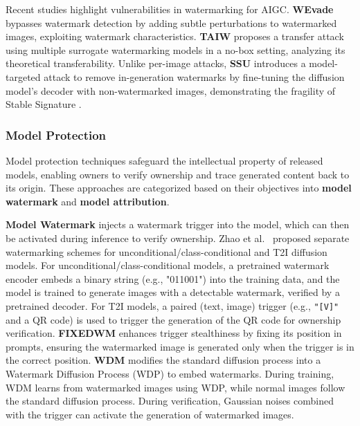 Recent studies highlight vulnerabilities in watermarking for AIGC. \textbf{WEvade} \cite{jiang2023evading} bypasses watermark detection by adding subtle perturbations to watermarked images, exploiting watermark characteristics. \textbf{TAIW} \cite{hu2024transfer} proposes a transfer attack using multiple surrogate watermarking models in a no-box setting, analyzing its theoretical transferability. Unlike per-image attacks, \textbf{SSU} \cite{hu2024stable} introduces a model-targeted attack to remove in-generation watermarks by fine-tuning the diffusion model’s decoder with non-watermarked images, demonstrating the fragility of Stable Signature \cite{fernandez2023stable}.

\subsubsection{Model Protection} 
Model protection techniques safeguard the intellectual property of released models, enabling owners to verify ownership and trace generated content back to its origin. These approaches are categorized based on their objectives into \textbf{model watermark} and \textbf{model attribution}.

\textbf{Model Watermark} injects a watermark trigger into the model, which can then be activated during inference to verify ownership.
Zhao et al.~\cite{zhao2023recipe} proposed separate watermarking schemes for unconditional/class-conditional and T2I diffusion models. For unconditional/class-conditional models, a pretrained watermark encoder embeds a binary string (e.g., "011001") into the training data, and the model is trained to generate images with a detectable watermark, verified by a pretrained decoder. For T2I models, a paired (text, image) trigger (e.g., \texttt{"[V]"} and a QR code) is used to trigger the generation of the QR code for ownership verification. \textbf{FIXEDWM} \cite{liu2023watermarking} enhances trigger stealthiness by fixing its position in prompts, ensuring the watermarked image is generated only when the trigger is in the correct position.  \textbf{WDM} \cite{peng2023protecting} modifies the standard diffusion process into a Watermark Diffusion Process (WDP) to embed watermarks. During training, WDM learns from watermarked images using WDP, while normal images follow the standard diffusion process. During verification, Gaussian noises combined with the trigger can activate the generation of watermarked images.


